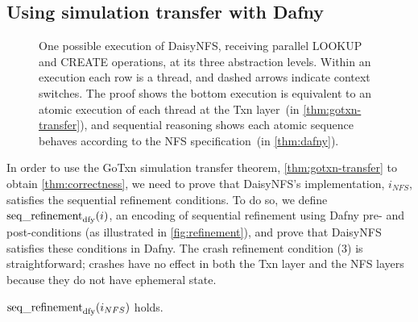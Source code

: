 \subsection{Using simulation transfer with Dafny}%
\label{sec:daisy:proof-dafny}

\begin{figure}
  \begin{center}
  
  \end{center}
  \caption[One execution of DaisyNFS at its three abstraction levels]{One possible execution of DaisyNFS, receiving parallel LOOKUP and
    CREATE operations, at its three abstraction levels.
    Within an execution each row is a thread, and dashed arrows indicate
    context switches.
    The proof shows the bottom execution is equivalent to an atomic execution of
    each thread at
    the Txn layer~(in \cref{thm:gotxn-transfer}),
    and sequential reasoning shows each atomic sequence behaves according to the NFS
    specification~(in \cref{thm:dafny}).}
  \label{fig:refinement-execs}
\end{figure}

In order to use the GoTxn simulation transfer theorem, \cref{thm:gotxn-transfer} to obtain \cref{thm:correctness}, we need to
prove that DaisyNFS's implementation, $i_{NFS}$, satisfies the sequential refinement conditions. To do so, we define
$\operatorname{seq\_refinement}_{\mathrm{dfy}}(i)$, an encoding of sequential refinement
using Dafny pre- and post-conditions (as illustrated in \cref{fig:refinement}), and prove that DaisyNFS
satisfies these conditions in Dafny. The crash refinement condition (3) is
straightforward; crashes have no effect in both the Txn layer and the NFS layers
because they do not have ephemeral state.

\begin{theorem} $\operatorname{seq\_refinement}_{\mathrm{dfy}}(i_{NFS})$ holds.
  \label{thm:dafny}
\end{theorem}

